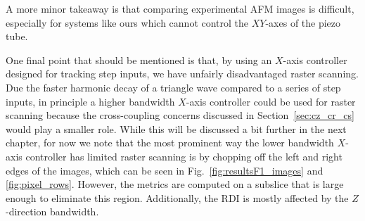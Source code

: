 A more minor takeaway is that comparing experimental AFM images is difficult, especially for systems like ours which cannot control the $XY$-axes of the piezo tube.

One final point that should be mentioned is that, by using an $X$-axis controller designed for tracking step inputs, we have unfairly disadvantaged raster scanning. Due the faster harmonic decay of a triangle wave compared to a series of step inputs, in principle a higher bandwidth $X$-axis controller could be used for raster scanning because the cross-coupling concerns discussed in Section~\ref{sec:cz_cr_cs} would play a smaller role. While this will be discussed a bit further in the next chapter, for now we note that the most prominent way the lower bandwidth $X$-axis controller has limited raster scanning is by chopping off the left and right edges of the images, which can be seen in Fig.~\ref{fig:resultsF1_images} and \ref{fig:pixel_rows}. However, the metrics are computed on a subslice that is large enough to eliminate this region. Additionally, the RDI is mostly affected by the $Z$-direction bandwidth.




% 
% 
% 




